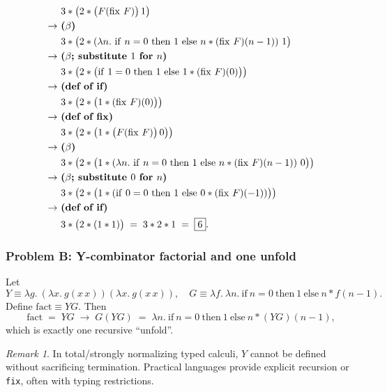 \documentclass{article}
\theoremstyle{theorem}
\theoremstyle{definition}
\theoremstyle{remark}
\newtheorem{remark}[theorem]{Remark}
\begin{document}
\[\begin{aligned}
&3 * \big(2 * \big(F(\mathrm{fix}\ F)\big)\,1\big)\\
\to\ &\text{\textbf{($\beta$)}}\\
&3 * \big(2 * (\lambda n.\ \mathrm{if}\ n=0\ \mathrm{then}\ 1\ \mathrm{else}\ n * (\mathrm{fix}\ F)(n-1))\ 1\big)\\
\to\ &\text{\textbf{($\beta$; substitute $1$ for $n$)}}\\
&3 * \big(2 * \big(\mathrm{if}\ 1=0\ \mathrm{then}\ 1\ \mathrm{else}\ 1 * (\mathrm{fix}\ F)(0)\big)\big)\\
\to\ &\text{\textbf{(def of if)}}\\
&3 * \big(2 * \big(1 * (\mathrm{fix}\ F)(0)\big)\big)\\
\to\ &\text{\textbf{(def of fix)}}\\
&3 * \big(2 * \big(1 * \big(F(\mathrm{fix}\ F)\big)\,0\big)\big)\\
\to\ &\text{\textbf{($\beta$)}}\\
&3 * \big(2 * \big(1 * (\lambda n.\ \mathrm{if}\ n=0\ \mathrm{then}\ 1\ \mathrm{else}\ n * (\mathrm{fix}\ F)(n-1))\ 0\big)\big)\\
\to\ &\text{\textbf{($\beta$; substitute $0$ for $n$)}}\\
&3 * \big(2 * \big(1 * (\mathrm{if}\ 0=0\ \mathrm{then}\ 1\ \mathrm{else}\ 0 * (\mathrm{fix}\ F)(-1))\big)\big)\\
\to\ &\text{\textbf{(def of if)}}\\
&3 * \big(2 * (1 * 1)\big) \;=\; 3 * 2 * 1 \;=\; \boxed{6}.
\end{aligned}
\]

\subsubsection*{Problem B: Y-combinator factorial and one unfold}
Let
\[
Y \equiv \lambda g.\ (\lambda x.\ g(x\,x))(\lambda x.\ g(x\,x)),\quad
G \equiv \lambda f.\ \lambda n.\ \mathrm{if}\ n=0\ \mathrm{then}\ 1\ \mathrm{else}\ n * f(n-1).
\]
Define $\mathrm{fact} \equiv YG$. Then
\[
\mathrm{fact} \;=\; YG \;\to\; G(YG) \;=\; \lambda n.\ \mathrm{if}\ n=0\ \mathrm{then}\ 1\ \mathrm{else}\ n * (YG)(n-1),
\]
which is exactly one recursive ``unfold''.

\begin{remark}
In total/strongly normalizing typed calculi, $Y$ cannot be defined without sacrificing termination. Practical languages provide explicit recursion or \texttt{fix}, often with typing restrictions.
\end{remark}
\end{document}
